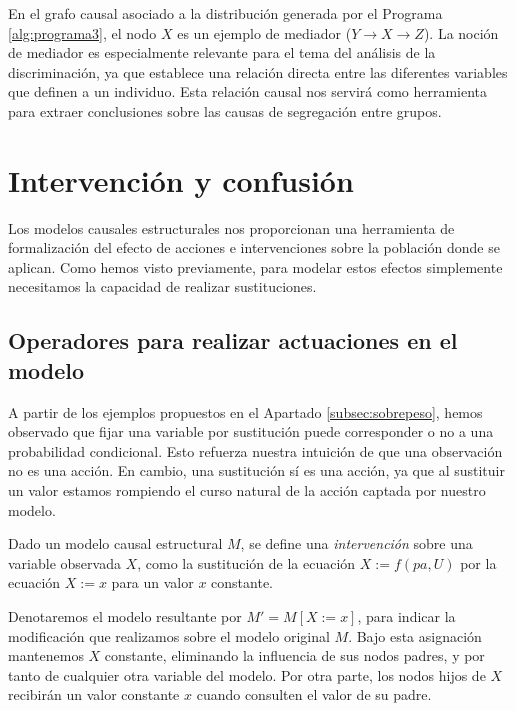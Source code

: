 \documentclass[oneside,openright,titlepage,numbers=noenddot,openany,headinclude,footinclude=true,
cleardoublepage=empty,abstractoff,BCOR=5mm,paper=a4,fontsize=12pt,main=spanish]{scrreprt}
\begin{document}
En el grafo causal asociado a la distribución generada por el Programa \ref{alg:programa3}, el nodo $X$ es un ejemplo de mediador ($Y \to X \to Z$). La noción de mediador es especialmente relevante para el tema del análisis de la discriminación, ya que establece una relación directa entre las diferentes variables que definen a un individuo. Esta relación causal nos servirá como herramienta para extraer conclusiones sobre las causas de segregación entre grupos.

\section{Intervención y confusión}

Los modelos causales estructurales nos proporcionan una herramienta de formalización del efecto de acciones e intervenciones sobre la población donde se aplican. Como hemos visto previamente, para modelar estos efectos simplemente necesitamos la capacidad de realizar sustituciones.

\subsection{Operadores para realizar actuaciones en el modelo}

A partir de los ejemplos propuestos en el Apartado \ref{subsec:sobrepeso}, hemos observado que fijar una variable por sustitución puede corresponder o no a una probabilidad condicional. Esto refuerza nuestra intuición de que una observación no es una acción. En cambio, una sustitución sí es una acción, ya que al sustituir un valor estamos rompiendo el curso natural de la acción captada por nuestro modelo.\\

\begin{definition}[Intervención]
Dado un modelo causal estructural $M$, se define una \textit{intervención} sobre una variable observada $X$, como la sustitución de la ecuación $X:=f(pa,U)$ por la ecuación $X:=x$ para un valor $x$ constante.
\end{definition}

\clearpage

Denotaremos el modelo resultante por $M' = M[X := x]$, para indicar la modificación que realizamos sobre el modelo original $M$. Bajo esta asignación mantenemos $X$ constante, eliminando la influencia de sus nodos padres, y por tanto de cualquier otra variable del modelo. Por otra parte, los nodos hijos de $X$ recibirán un valor constante $x$ cuando consulten el valor de su padre.\\
\end{document}
